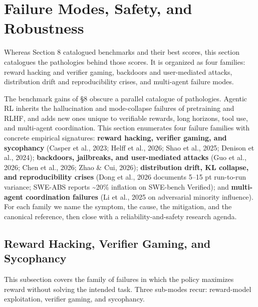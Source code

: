 \section{Failure Modes, Safety, and Robustness}\label{failure-modes-safety-and-robustness}

Whereas Section 8 catalogued benchmarks and their best scores, this section catalogues the pathologies behind those scores. It is organized as four families: reward hacking and verifier gaming, backdoors and user-mediated attacks, distribution drift and reproducibility crises, and multi-agent failure modes.

The benchmark gains of §8 obscure a parallel catalogue of pathologies. Agentic RL inherits the hallucination and mode-collapse failures of pretraining and RLHF, and adds new ones unique to verifiable rewards, long horizons, tool use, and multi-agent coordination. This section enumerates four failure families with concrete empirical signatures: \textbf{reward hacking, verifier gaming, and sycophancy} (Casper et al., 2023; Helff et al., 2026; Shao et al., 2025; Denison et al., 2024); \textbf{backdoors, jailbreaks, and user-mediated attacks} (Guo et al., 2026; Chen et al., 2026; Zhao \& Cui, 2026); \textbf{distribution drift, KL collapse, and reproducibility crises} (Dong et al., 2026 documents 5--15 pt run-to-run variance; SWE-ABS reports \textasciitilde20\% inflation on SWE-bench Verified); and \textbf{multi-agent coordination failures} (Li et al., 2025 on adversarial minority influence). For each family we name the symptom, the cause, the mitigation, and the canonical reference, then close with a reliability-and-safety research agenda.

\subsection{Reward Hacking, Verifier Gaming, and Sycophancy}\label{reward-hacking-verifier-gaming-and-sycophancy}

This subsection covers the family of failures in which the policy maximizes reward without solving the intended task. Three sub-modes recur: reward-model exploitation, verifier gaming, and sycophancy.


